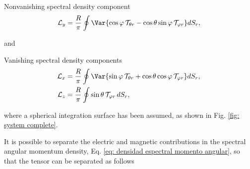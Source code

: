 %
\begin{mybox}{\centering Nonvanishing spectral density component}
\begin{equation}
\mathcal{L}_y = \frac{R}{\pi}\oint \Var{\cos\varphi \,\mathcal{T}_{\theta r} - \cos\theta\sin\varphi\,\mathcal{T}_{\varphi r}} dS_r,
\label{eq: Ly spectral density r theta}
\end{equation}
\end{mybox}	
% 
and
%
\begin{mybox}{\centering  Vanishing spectral density components}
\vspace{-0.55cm}
\begin{align}
\mathcal{L}_x &= \frac{R}{\pi}\oint \Var{\sin\varphi \,\mathcal{T}_{\theta r} + \cos\theta\cos\varphi\,\mathcal{T}_{\varphi r}} dS_r,
\label{eq: Lx spectral density r theta} \\
\mathcal{L}_z &= \frac{R}{\pi}\oint \sin\theta \, \mathcal{T}_{\varphi r} \, dS_r,
\label{eq: Lz spectral density r theta}
\end{align}
\end{mybox}	
% 
\noindent where a spherical integration surface has been assumed, as shown in Fig. \ref{fig: system complete}.

It is possible to separate the electric and magnetic contributions in the spectral angular momentum density, Eq. \eqref{eq: densidad espectral momento angular}, so that the tensor can be separated as follows

